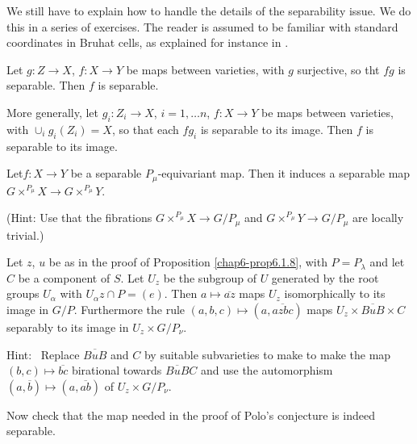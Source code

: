 We still have to explain how to handle the details of the separability
issue. We do this in a series of exercises. The reader is assumed to
be familiar with standard coordinates in Bruhat cells, as explained
for instance in \cite[Chapter 10]{key34}.

\begin{exercise}\label{chap6-exer6.2.3}
Let $g:Z\to X$, $f:X\to Y$ be maps between varieties, with $g$
surjective, so tht $fg$ is separable. Then $f$ is separable.
\end{exercise}

\begin{exercise}\label{chap6-exer6.2.4}
More generally, let $g_{i}:Z_{i}\to X$, $i=1,\ldots n$, $f:X\to Y$ be
maps between varieties, with $\cup_{i}g_{i}(Z_{i})=X$, so that each
$fg_{i}$ is separable to its image. Then $f$ is separable to its
image. 
\end{exercise}

\begin{exercise}\label{chap6-exer6.2.5}
Let\pageoriginale $f:X\to Y$\label{page64} be a separable $P_{\mu}$-equivariant
map. Then it induces a separable map $G\times^{P_{\mu}}X\to
G\times^{P_{\mu}}Y$.

\noindent
(Hint: Use that the fibrations $G\times^{P_{\mu}}X\to G/P_{\mu}$ and
$G\times^{P_{\mu}}Y\to G/P_{\mu}$ are locally trivial.)
\end{exercise}

\begin{exercise}\label{chap6-exer6.2.6}
Let $z$, $u$ be as in the proof of Proposition \ref{chap6-prop6.1.8},
with $P=P_{\lambda}$ and let $C$ be a component of $S$. Let $U_{z}$ be
the subgroup of $U$ generated by the root groups $U_{\alpha}$ with
$U_{\alpha}z\cap P=(e)$. Then $a\mapsto \overline{az}$ maps $U_{z}$
isomorphically to its image in $G/P$. Furthermore the rule
$(a,b,c)\mapsto (a,\overline{azbc})$ maps $U_{z}\times
\overline{BuB}\times C$ separably to its image in $U_{z}\times
G/P_{\nu}$.
\end{exercise}

Hint:~ Replace $\overline{BuB}$ and $C$ by suitable subvarieties to
make to make the map $(b,c)\mapsto \overline{bc}$ birational towards
$\overline{BuB}C$ and use the automorphism $(a,\overline{b})\mapsto
(a,\overline{ab})$ of $U_{z}\times G/P_{\nu}$.

\begin{exercise}\label{chap6-exer6.2.7}
Now check that the map needed in the proof of Polo's conjecture is
indeed separable.
\end{exercise}

